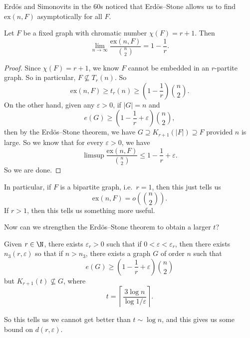 \documentclass[a4paper]{article}
\renewcommand\ex{\mathrm{ex}}
\begin{document}

Erd\"os and Simonovits in the 60s noticed that Erd\"os--Stone allows us to find $\ex(n, F)$ asymptotically for all $F$.

\begin{thm}
  Let $F$ be a fixed graph with chromatic number $\chi(F) = r + 1$. Then
  \[
    \lim_{n \to \infty} \frac{\ex(n, F)}{\binom{n}{2}} = 1 - \frac{1}{r}.
  \]
\end{thm}

\begin{proof}
  Since $\chi(F) = r + 1$, we know $F$ cannot be embedded in an $r$-partite graph. So in particular, $F \not\subseteq T_r(n)$. So
  \[
    \ex(n, F) \geq t_r(n) \geq \left(1 - \frac{1}{r}\right)\binom{n}{2}.
  \]
  On the other hand, given any $\varepsilon > 0$, if $|G| = n$ and
  \[
    e(G) \geq \left(1 - \frac{1}{r} + \varepsilon\right) \binom{n}{2},
  \]
  then by the Erd\"os--Stone theorem, we have $G \supseteq K_{r + 1}(|F|) \supseteq F$ provided $n$ is large. So we know that for every $\varepsilon > 0$, we have
  \[
    \limsup \frac{\ex(n, F)}{\binom{n}{2}} \leq 1 - \frac{1}{r} + \varepsilon.
  \]
  So we are done.
\end{proof}
In particular, if $F$ is a bipartite graph, i.e.\ $r = 1$, then this just tells us
\[
  \ex(n, F) = o\left(\binom{n}{2}\right).
\]
If $r > 1$, then this tells us something more useful.

Now can we strengthen the Erd\"os--Stone theorem to obtain a larger $t$?
\begin{thm}
  Given $r \in \N$, there exists $\varepsilon_r > 0$ such that if $0 < \varepsilon < \varepsilon_r$, then there exists $n_3(r, \varepsilon)$ so that if $n > n_3$, there exists a graph $G$ of order $n$ such that
  \[
    e(G) \geq \left(1 - \frac{1}{r} + \varepsilon\right) \binom{n}{2}
  \]
  but $K_{r + 1}(t) \not\subseteq G$, where
  \[
    t = \left\lceil \frac{3 \log n}{\log 1/\varepsilon}\right\rceil.
  \]
\end{thm}
So this tells us we cannot get better than $t \sim \log n$, and this gives us some bound on $d(r, \varepsilon)$.
\end{document}
